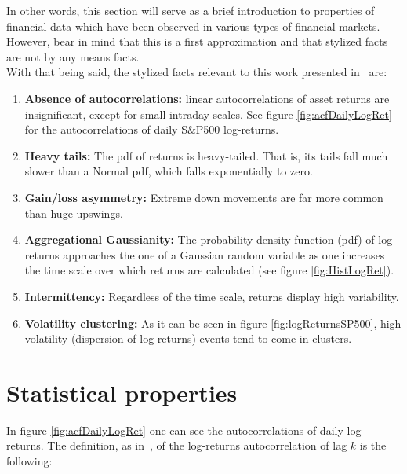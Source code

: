 In other words, this section will serve as a brief introduction to 
properties of financial data which have been observed in various types of 
financial markets. However, bear in mind that this is a first approximation 
and that stylized facts are not by any means facts.\\

With that being said, the stylized facts relevant to this work presented 
in~\cite{stylizedFacts} are:

\begin{enumerate}
	\item \textbf{Absence of autocorrelations:} linear autocorrelations of 
	asset returns are insignificant, except for small intraday scales. See 
	figure \ref{fig:acfDailyLogRet} for the autocorrelations of daily 
	S\&P500 log-returns.
	
	\item \textbf{Heavy tails:} The pdf of returns is heavy-tailed. That is, 
	its tails fall much slower than a Normal pdf, which falls exponentially 
	to zero.
	
	\item \textbf{Gain/loss asymmetry:} Extreme down movements are far more 
	common than huge upswings.
	
	\item \textbf{Aggregational Gaussianity:} The probability density 
	function (pdf) of log-returns approaches the one of a Gaussian random 
	variable as one increases the time scale over which returns are 
	calculated (see figure \ref{fig:HistLogRet}).
	
	\item \textbf{Intermittency:} Regardless of the time scale, returns 
	display high variability.
	
	\item \textbf{Volatility clustering:} As it can be seen in figure 
	\ref{fig:logReturnsSP500}, high volatility (dispersion of log-returns) 
	events tend to come in clusters.
\end{enumerate}



\section{Statistical properties}
In figure \ref{fig:acfDailyLogRet} one can see the autocorrelations of daily 
log-returns. The definition, as in~\cite{acfDefinition}, of the 
log-returns autocorrelation of lag $k$ is the following:

